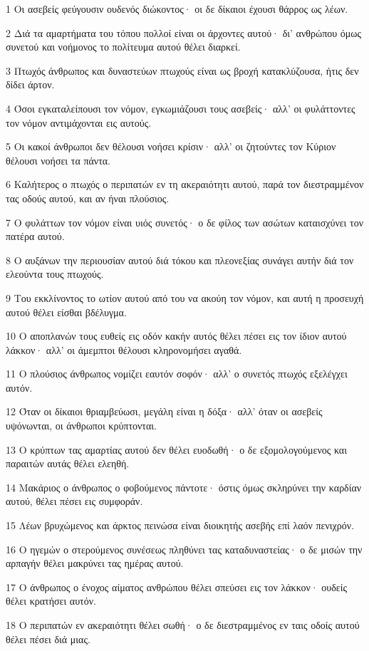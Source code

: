 \par 1 Οι ασεβείς φεύγουσιν ουδενός διώκοντος· οι δε δίκαιοι έχουσι θάρρος ως λέων.
\par 2 Διά τα αμαρτήματα του τόπου πολλοί είναι οι άρχοντες αυτού· δι' ανθρώπου όμως συνετού και νοήμονος το πολίτευμα αυτού θέλει διαρκεί.
\par 3 Πτωχός άνθρωπος και δυναστεύων πτωχούς είναι ως βροχή κατακλύζουσα, ήτις δεν δίδει άρτον.
\par 4 Όσοι εγκαταλείπουσι τον νόμον, εγκωμιάζουσι τους ασεβείς· αλλ' οι φυλάττοντες τον νόμον αντιμάχονται εις αυτούς.
\par 5 Οι κακοί άνθρωποι δεν θέλουσι νοήσει κρίσιν· αλλ' οι ζητούντες τον Κύριον θέλουσι νοήσει τα πάντα.
\par 6 Καλήτερος ο πτωχός ο περιπατών εν τη ακεραιότητι αυτού, παρά τον διεστραμμένον τας οδούς αυτού, και αν ήναι πλούσιος.
\par 7 Ο φυλάττων τον νόμον είναι υιός συνετός· ο δε φίλος των ασώτων καταισχύνει τον πατέρα αυτού.
\par 8 Ο αυξάνων την περιουσίαν αυτού διά τόκου και πλεονεξίας συνάγει αυτήν διά τον ελεούντα τους πτωχούς.
\par 9 Του εκκλίνοντος το ωτίον αυτού από του να ακούη τον νόμον, και αυτή η προσευχή αυτού θέλει είσθαι βδέλυγμα.
\par 10 Ο αποπλανών τους ευθείς εις οδόν κακήν αυτός θέλει πέσει εις τον ίδιον αυτού λάκκον· αλλ' οι άμεμπτοι θέλουσι κληρονομήσει αγαθά.
\par 11 Ο πλούσιος άνθρωπος νομίζει εαυτόν σοφόν· αλλ' ο συνετός πτωχός εξελέγχει αυτόν.
\par 12 Όταν οι δίκαιοι θριαμβεύωσι, μεγάλη είναι η δόξα· αλλ' όταν οι ασεβείς υψόνωνται, οι άνθρωποι κρύπτονται.
\par 13 Ο κρύπτων τας αμαρτίας αυτού δεν θέλει ευοδωθή· ο δε εξομολογούμενος και παραιτών αυτάς θέλει ελεηθή.
\par 14 Μακάριος ο άνθρωπος ο φοβούμενος πάντοτε· όστις όμως σκληρύνει την καρδίαν αυτού, θέλει πέσει εις συμφοράν.
\par 15 Λέων βρυχώμενος και άρκτος πεινώσα είναι διοικητής ασεβής επί λαόν πενιχρόν.
\par 16 Ο ηγεμών ο στερούμενος συνέσεως πληθύνει τας καταδυναστείας· ο δε μισών την αρπαγήν θέλει μακρύνει τας ημέρας αυτού.
\par 17 Ο άνθρωπος ο ένοχος αίματος ανθρώπου θέλει σπεύσει εις τον λάκκον· ουδείς θέλει κρατήσει αυτόν.
\par 18 Ο περιπατών εν ακεραιότητι θέλει σωθή· ο δε διεστραμμένος εν ταις οδοίς αυτού θέλει πέσει διά μιας.
